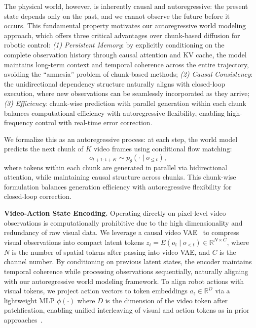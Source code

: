 \documentclass[onecolumn]{robbyant}           %
\begin{document}
The physical world, however, is inherently causal and autoregressive: the present state depends only on the past, and we cannot observe the future before it occurs.
This fundamental property motivates our autoregressive world modeling approach, which offers three critical advantages over chunk-based diffusion for robotic control:
\textit{(1) Persistent Memory}: by explicitly conditioning on the complete observation history through causal attention and KV cache, the model maintains long-term context and temporal coherence across the entire trajectory, avoiding the ``amnesia'' problem of chunk-based methods;
\textit{(2) Causal Consistency}: the unidirectional dependency structure naturally aligns with closed-loop execution, where new observations can be seamlessly incorporated as they arrive;
\textit{(3) Efficiency}: chunk-wise prediction with parallel generation within each chunk balances computational efficiency with autoregressive flexibility, enabling high-frequency control with real-time error correction.

We formalize this as an autoregressive process: at each step, the world model predicts the next chunk of $K$ video frames using conditional flow matching:
\begin{equation}
o_{t+1:t+K} \sim p_\theta( \cdot \mid o_{\leq t}),
\end{equation}
where tokens within each chunk are generated in parallel via bidirectional attention, while maintaining causal structure across chunks.
This chunk-wise formulation balances generation efficiency with autoregressive flexibility for closed-loop correction.

\noindent\textbf{Video-Action State Encoding.}
Operating directly on pixel-level video observations is computationally prohibitive due to the high dimensionality and redundancy of raw visual data.
We leverage a causal video VAE~\cite{wan2024video} to compress visual observations into compact latent tokens $z_t = E(o_t \mid o_{<t}) \in \mathbb{R}^{N \times C}$, where $N$ is the number of spatial tokens after passing into video VAE, and $C$ is the channel number.
By conditioning on previous latent states, the encoder maintains temporal coherence while processing observations sequentially, naturally aligning with our autoregressive world modeling framework.
To align robot actions with visual tokens, we project action vectors to token embeddings $a_t \in \mathbb{R}^{D}$ via a lightweight MLP $\phi(\cdot)$ where $D$ is the dimension of the video token after patchfication, enabling unified interleaving of visual and action tokens as in prior approaches~\cite{vidar, motus}.
\end{document}
